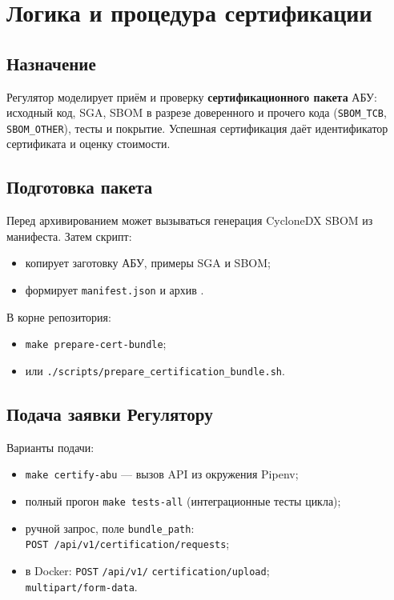 \chapter{Логика и процедура сертификации}
\label{ch:certification}

\section{Назначение}

Регулятор моделирует приём и проверку \textbf{сертификационного пакета} АБУ: исходный код, SGA, SBOM в разрезе доверенного и прочего кода (\texttt{SBOM\_TCB}, \texttt{SBOM\_OTHER}), тесты и покрытие. Успешная сертификация даёт идентификатор сертификата и оценку стоимости.

\section{Подготовка пакета}

Перед архивированием может вызываться генерация CycloneDX SBOM из манифеста. Затем скрипт:

\begin{itemize}
  \item копирует заготовку АБУ, примеры SGA и SBOM;
  \item формирует \texttt{manifest.json} и архив .
\end{itemize}

В корне репозитория:

\begin{itemize}
  \item \texttt{make prepare-cert-bundle};
  \item или \texttt{./scripts/prepare\_certification\_bundle.sh}.
\end{itemize}

\section{Подача заявки Регулятору}

Варианты подачи:

\begin{itemize}
  \item \texttt{make certify-abu} --- вызов API из окружения Pipenv;
  \item полный прогон \texttt{make tests-all} (интеграционные тесты цикла);
  \item ручной запрос, поле \texttt{bundle\_path}:\\
  {\small\texttt{POST /api/v1/certification/requests}};
  \item в Docker: \texttt{POST} \texttt{/api/v1/} \texttt{certification/upload};\\
  \texttt{multipart/form-data}.
\end{itemize}

